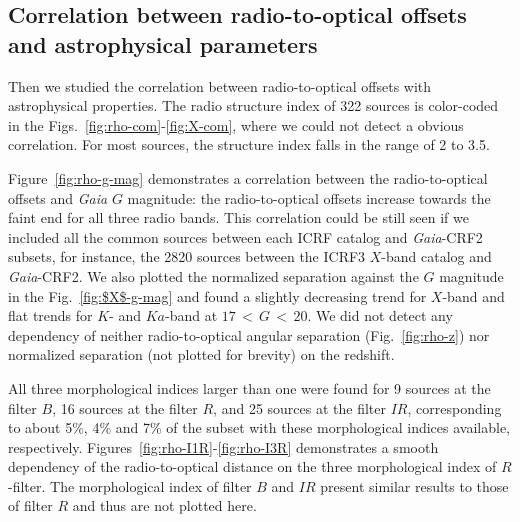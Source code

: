 \documentclass{aa-note}   %
\begin{document}
\subsection{Correlation between radio-to-optical offsets and astrophysical parameters}    \label{subsec:r2o-corr}

Then we studied the correlation between radio-to-optical offsets with astrophysical properties.
The radio structure index of 322 sources is color-coded in the Figs.~\ref{fig:rho-com}-\ref{fig:X-com}, where we could not detect a obvious correlation. %
For most sources, the structure index falls in the range of 2 to 3.5.

Figure~\ref{fig:rho-g-mag} demonstrates a correlation between the radio-to-optical offsets and \textit{Gaia} $G$ magnitude: the radio-to-optical offsets increase towards the faint end for all three radio bands.
This correlation could be still seen if we included all the common sources between each ICRF catalog and \textit{Gaia}-CRF2 subsets, for instance, the 2820 sources between the ICRF3 $X$-band catalog and \textit{Gaia}-CRF2.
We also plotted the normalized separation against the $G$ magnitude in the Fig.~\ref{fig:$X$-g-mag} and found a slightly decreasing trend for $X$-band and flat trends for $K$- and $Ka$-band at $17\,<\,G\,<\,20$.
We did not detect any dependency of neither radio-to-optical angular separation (Fig.~\ref{fig:rho-z}) nor normalized separation (not plotted for brevity) on the redshift.


All three morphological indices larger than one were found for 
9 sources at the filter $B$, 16 sources at the filter $R$, and 25 sources at the filter $IR$, corresponding to about 5\%, 4\% and 7\% of the subset with these morphological indices available, respectively.
Figures~\ref{fig:rho-I1R}-\ref{fig:rho-I3R} demonstrates a smooth dependency of the radio-to-optical distance on the three morphological index of $R$-filter.
The morphological index of filter $B$ and $IR$ present similar results to those of filter $R$ and thus are not plotted here.
\end{document}

